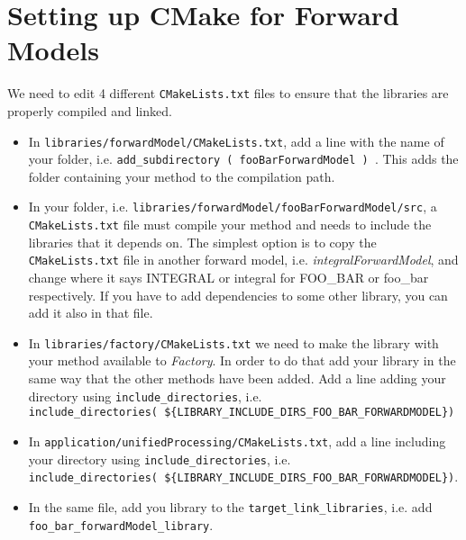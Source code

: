 \documentclass{article}
\begin{document}
\section{Setting up CMake for Forward Models}
We need to edit 4 different \texttt{CMakeLists.txt} files to ensure that the libraries are properly compiled and linked.
\begin{itemize}
    \item In \texttt{libraries/forwardModel/CMakeLists.txt}, add a line with the name of your folder, i.e. \texttt{add\_subdirectory ( fooBarForwardModel ) }. This adds the folder containing your method to the compilation path.
    \item In your folder, i.e. \texttt{libraries/forwardModel/fooBarForwardModel/src}, a \texttt{CMakeLists.txt} file must compile your method and needs to include the libraries that it depends on. The simplest option is to copy the \texttt{CMakeLists.txt} file in another forward model, i.e. \textit{integralForwardModel}, and change where it says INTEGRAL or integral for FOO\_BAR or foo\_bar respectively. If you have to add dependencies to some other library, you can add it also in that file.
    \item In \texttt{libraries/factory/CMakeLists.txt} we need to make the library with your method available to \textit{Factory}. In order to do that add your library in the same way that the other methods have been added. Add a line adding your directory using \texttt{include\_directories}, i.e.\\\texttt{include\_directories( \$\{LIBRARY\_INCLUDE\_DIRS\_FOO\_BAR\_FORWARDMODEL\})}
    \item In \texttt{application/unifiedProcessing/CMakeLists.txt}, add a line including your directory using \texttt{include\_directories}, i.e. \\\texttt{include\_directories( \$\{LIBRARY\_INCLUDE\_DIRS\_FOO\_BAR\_FORWARDMODEL\})}.
    \item In the same file, add you library to the \texttt{target\_link\_libraries}, i.e. add \texttt{foo\_bar\_forwardModel\_library}.
\end{itemize}
\end{document}
